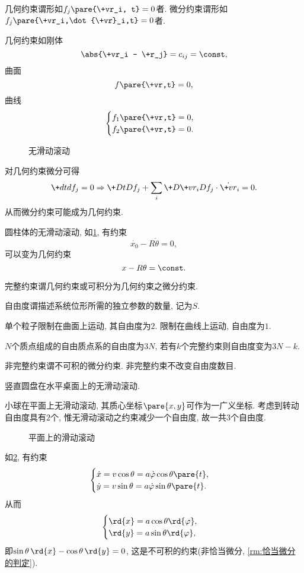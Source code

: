 \documentclass[../LectureNotes.tex]{subfiles}
\begin{document}
几何约束谓形如$\displaystyle f_j\pare{\+vr_i, t} = 0$者. 微分约束谓形如$\displaystyle f_j\pare{\+vr_i,\dot{\+vr}_i,t} = 0$者.
\begin{ex}
    几何约束如刚体
    \[ \abs{\+vr_i - \+r_j} = c_{ij} = \const, \]
    曲面
    \[ f\pare{\+vr,t} = 0, \]
    曲线
    \[ \begin{cases}
        f_1\pare{\+vr,t} = 0,\\
        f_2\pare{\+vr,t} = 0.
    \end{cases} \]
\end{ex}
\begin{figure}[ht]
    \centering
    \caption{无滑动滚动}
    \label{fig:无滑动滚动}
\end{figure}
对几何约束微分可得
\[ \+dtd{f_j} = 0\Rightarrow \+DtD{f_j} + \sum_i \+D{\+vr_i}D{f_j}\cdot\dot{\+vr}_i = 0. \]
从而微分约束可能成为几何约束.
\begin{ex}
    圆柱体的无滑动滚动, 如\cref{fig:无滑动滚动}, 有约束
    \[ \dot{x_0} - R\dot{\theta} = 0, \]
    可以变为几何约束
    \[ x - R\theta = \const. \]
\end{ex}
\begin{definition}[完整约束]
    完整约束谓几何约束或可积分为几何约束之微分约束.
\end{definition}
\begin{definition}[自由度]
    自由度谓描述系统位形所需的独立参数的数量, 记为$S$.
\end{definition}
\begin{ex}
    单个粒子限制在曲面上运动, 其自由度为$2$. 限制在曲线上运动, 自由度为$1$.
\end{ex}
\begin{ex}
    $N$个质点组成的自由质点系的自由度为$3N$, 若有$k$个完整约束则自由度变为$3N-k$.
\end{ex}
非完整约束谓不可积的微分约束. 非完整约束不改变自由度数目.
\begin{ex}
    竖直圆盘在水平桌面上的无滑动滚动.
\end{ex}
\begin{ex}
    小球在平面上无滑动滚动, 其质心坐标$\pare{x,y}$可作为一广义坐标. 考虑到转动自由度具有$2$个, 惟无滑动滚动之约束减少一个自由度, 故一共$3$个自由度. 
\end{ex}
\begin{figure}[ht]
    \centering
    \caption{平面上的滑动滚动}
    \label{fig:平面上的无滑动滚动}
\end{figure}
\begin{ex}
    如\cref{fig:平面上的无滑动滚动}, 有约束
    \[ \begin{cases}
        \dot{x} = v\cos\theta = a\dot{\varphi} \cos\theta\pare{t},\\
        \dot{y} = v\sin\theta = a\dot{\varphi} \sin\theta\pare{t}.
    \end{cases} \]
    从而
    \[ \begin{cases}
        \rd{x} = a\cos\theta\rd{\varphi},\\
        \rd{y} = a\sin\theta \rd{\varphi},
    \end{cases} \]
    即$\sin\theta\,\rd{x} - \cos \theta\,\rd{y} = 0$, 这是不可积的约束(非恰当微分, \cref{rm:恰当微分的判定}).
\end{ex}
\end{document}
